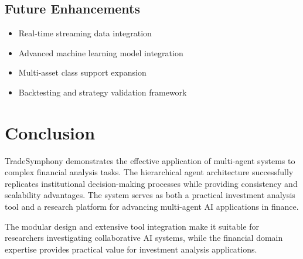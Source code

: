 \documentclass[11pt,a4paper]{article}
\begin{document}
\subsection{Future Enhancements}
\begin{itemize}
    \item Real-time streaming data integration
    \item Advanced machine learning model integration
    \item Multi-asset class support expansion
    \item Backtesting and strategy validation framework
\end{itemize}

\section{Conclusion}

TradeSymphony demonstrates the effective application of multi-agent systems to complex financial analysis tasks. The hierarchical agent architecture successfully replicates institutional decision-making processes while providing consistency and scalability advantages. The system serves as both a practical investment analysis tool and a research platform for advancing multi-agent AI applications in finance.

The modular design and extensive tool integration make it suitable for researchers investigating collaborative AI systems, while the financial domain expertise provides practical value for investment analysis applications.
\end{document}
